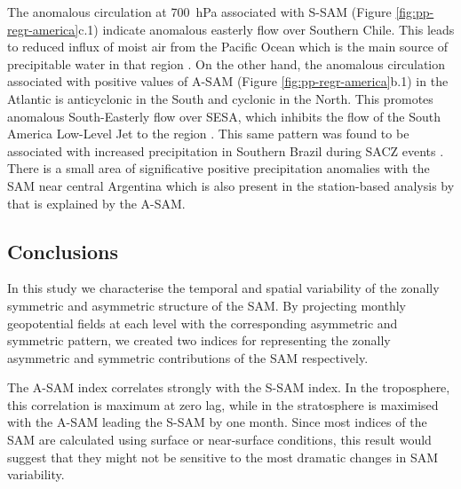 \documentclass[smallextended]{svjour3}       %
\begin{document}
The anomalous circulation at 700~hPa associated with S\nobreakdash-SAM (Figure \ref{fig:pp-regr-america}c.1) indicate anomalous easterly flow over Southern Chile. This leads to reduced influx of moist air from the Pacific Ocean which is the main source of precipitable water in that region \citep[e.g.][]{garreaud2007}. On the other hand, the anomalous circulation associated with positive values of A\nobreakdash-SAM (Figure \ref{fig:pp-regr-america}b.1) in the Atlantic is anticyclonic in the South and cyclonic in the North. This promotes anomalous South-Easterly flow over SESA, which inhibits the flow of the South America Low-Level Jet to the region \citep{silvestri2009, zamboni2010}. This same pattern was found to be associated with increased precipitation in Southern Brazil during SACZ events \citep{rosso2018}. There is a small area of significative positive precipitation anomalies with the SAM near central Argentina which is also present in the station-based analysis by \citet{gillett2006} that is explained by the A\nobreakdash-SAM.

\hypertarget{conclusions}{%
\subsection{Conclusions}\label{conclusions}}

In this study we characterise the temporal and spatial variability of the zonally symmetric and asymmetric structure of the SAM. By projecting monthly geopotential fields at each level with the corresponding asymmetric and symmetric pattern, we created two indices for representing the zonally asymmetric and symmetric contributions of the SAM respectively.

The A\nobreakdash-SAM index correlates strongly with the S\nobreakdash-SAM index. In the troposphere, this correlation is maximum at zero lag, while in the stratosphere is maximised with the A\nobreakdash-SAM leading the S\nobreakdash-SAM by one month. Since most indices of the SAM are calculated using surface or near-surface conditions, this result would suggest that they might not be sensitive to the most dramatic changes in SAM variability.
\end{document}
